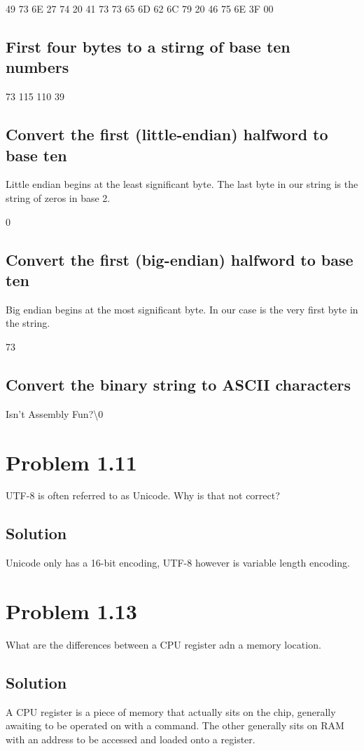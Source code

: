 \documentclass[letterpaper,11pt]{texMemo} %
\begin{document}
49 73 6E 27 74 20 41 73 73 65 6D 62 6C 79 20 46 75 6E 3F 00

\subsection*{First four bytes to a stirng of base ten numbers}
73 115 110 39

\subsection*{Convert the first (little-endian) halfword to base ten}
Little endian begins at the least significant byte. The last byte in our string is the string of zeros in base 2.

0

\subsection*{Convert the first (big-endian) halfword to base ten}
Big endian begins at the most significant byte. In our case is the very first byte in the string.

73

\subsection*{Convert the binary string to ASCII characters}
Isn't Assembly Fun?\textbackslash0

\newpage
\section*{Problem 1.11}
UTF-8 is often referred to as Unicode. Why is that not correct?

\subsection*{Solution}
Unicode only has a 16-bit encoding, UTF-8 however is variable length encoding.

\section*{Problem 1.13}
What are the differences between a CPU register adn a memory location.

\subsection*{Solution}
A CPU register is a piece of memory that actually sits on the chip, generally awaiting to be operated
on with a command. The other generally sits on RAM with an address to be accessed and loaded onto a register.
\end{document}
